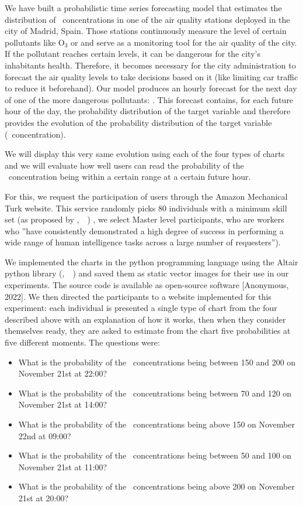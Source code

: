 \documentclass[a4paper,3p,sort&compress]{elsarticle}
\DeclareRobustCommand{\citeext}[1]{\citeauthor{#1},~\citeyear{#1}~\cite{#1}}
\begin{document}
We have built a probabilistic time series forecasting model that estimates the
distribution of \no~concentrations in one of the air quality stations deployed
in the city of Madrid, Spain. Those stations continuously measure the level of
certain pollutants like O$_{3}$ or \no and serve as a monitoring tool for the
air quality of the city. If the pollutant reaches certain levels, it can be
dangerous for the city's inhabitants health. Therefore, it becomes necessary for
the city administration to forecast the air quality levels to take decisions
based on it (like limiting car traffic to reduce it beforehand). Our model
produces an hourly forecast for the next day of one of the more dangerous
pollutants: \no. This forecast contains, for each future hour of the day, the
probability distribution of the target variable and therefore provides the
evolution of the probability distribution of the target variable
(\no~concentration).

We will display this very same evolution using each of the four types of charts
and we will evaluate how well users can read the probability of the
\no~concentration being within a certain range at a certain future hour.

For this, we request the participation of users through the Amazon Mechanical
Turk website. This service randomly picks 80 individuals with a minimum skill
set (as proposed by \citeext{brennen_instrument_2018}) , we select
Master level participants, who are workers who ''have consistently demonstrated
a high degree of success in performing a wide range of human intelligence tasks
across a large number of requesters'').

We implemented the charts in the python programming language using the Altair
python library (\citeext{vanderplas2018altair})  
and saved them as static vector
images for their use in our experiments. The source code is available as
open-source software [Anonymous, 2022]. 
We then directed the participants
to a website implemented for this experiment: each individual is presented a
single type of chart from the four described above with an explanation of how it
works, then when they consider themselves ready, they are asked to estimate from
the chart five probabilities at five different moments. The questions were:
\begin{itemize}
  \item What is the probability of the \no~concentrations being between 150 and 200 on November 21st at 22:00?
  \item What is the probability of the \no~concentrations being between 70 and 120 on November 21st at 14:00?
  \item What is the probability of the \no~concentrations being above 150 on November 22nd at 09:00?
  \item What is the probability of the \no~concentrations being between 50 and 100 on November 21st at 11:00?
  \item What is the probability of the \no~concentrations being above 200 on November 21st at 20:00?
\end{itemize}
\end{document}

